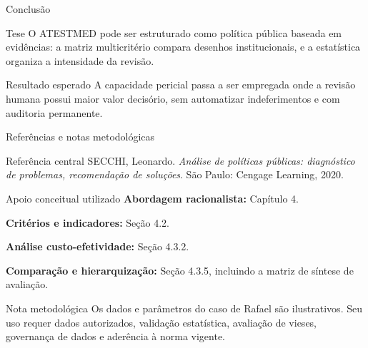 \documentclass[presentation,aspectratio=169]{beamer}
\begin{document}
\begin{frame}[t]{Conclusão}
\vspace{0.16cm}
\begin{block}{Tese}\small
O ATESTMED pode ser estruturado como política pública baseada em evidências: a matriz multicritério compara desenhos institucionais, e a estatística organiza a intensidade da revisão.
\end{block}
\vspace{0.32cm}
\begin{block}{Resultado esperado}\small
A capacidade pericial passa a ser empregada onde a revisão humana possui maior valor decisório, sem automatizar indeferimentos e com auditoria permanente.
\end{block}
\vfill
{}
\end{frame}

\begin{frame}[t]{Referências e notas metodológicas}
\begin{block}{Referência central}\footnotesize
SECCHI, Leonardo. \textit{Análise de políticas públicas: diagnóstico de problemas, recomendação de soluções}. São Paulo: Cengage Learning, 2020.
\end{block}
\vspace{0.18cm}
\begin{block}{Apoio conceitual utilizado}\small
\textbf{Abordagem racionalista:} Capítulo 4.\par\vspace{0.22em}
\textbf{Critérios e indicadores:} Seção 4.2.\par\vspace{0.22em}
\textbf{Análise custo-efetividade:} Seção 4.3.2.\par\vspace{0.22em}
\textbf{Comparação e hierarquização:} Seção 4.3.5, incluindo a matriz de síntese de avaliação.
\end{block}
\vspace{0.18cm}
\begin{block}{Nota metodológica}\footnotesize
Os dados e parâmetros do caso de Rafael são ilustrativos. Seu uso requer dados autorizados, validação estatística, avaliação de vieses, governança de dados e aderência à norma vigente.
\end{block}
\end{frame}
\end{document}
